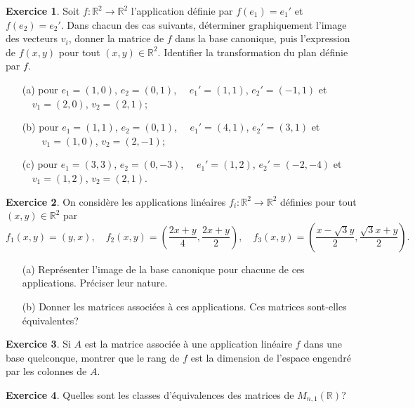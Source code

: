 \documentclass[11pt,a4paper]{article}
\theoremstyle{definition}
\newtheorem{exo}{Exercice}
\newcommand{\R}{\mathbb{R}}
\begin{document}
\begin{exo}
Soit $f: \R^2 \rightarrow \R^2$ l'application définie par $f(e_1)=e_1'$ et $f(e_2)=e_2'$. Dans chacun des cas suivants, déterminer graphiquement l'image des vecteurs $v_i$, donner la matrice de $f$ dans la base canonique, puis l'expression de $f(x,y)$ pour tout $(x,y)\in \R^2$.  Identifier la transformation du plan définie par $f$.
\begin{itemize}
\item[(a)] pour $e_1 = (1,0)$, $e_2=(0,1)$,  $\quad e_1' = (1,1)$, $e_2'=(-1,1)$ et $\quad v_1=(2,0)$, $v_2=(2,1)$;
\item[(b)] pour $e_1 = (1,1)$, $e_2=(0,1)$,  $\quad e_1' = (4,1)$, $e_2'=(3,1)$ et $\qquad v_1=(1,0)$, $v_2=(2,-1)$;
\item[(c)] pour $e_1 = (3,3)$, $ e_2=(0,-3)$, $\quad e_1' = (1,2)$, $e_2'=(-2,-4)$ et $\quad v_1=(1,2)$, $v_2=(2,1)$.

\end{itemize}
\end{exo}


\begin{exo}
On considère les applications linéaires $f_i : \R^2 \rightarrow \R^2$ définies pour tout $(x,y)\in \R^2$ par
$$f_1(x,y) = (y,x), \quad f_2(x,y) = \left({\frac{2x+y}{4},\frac{2x+y}{2}}\right), \quad f_3(x,y) = \left({\frac{x-\sqrt{3}y}{2},\frac{\sqrt{3}x+y}{2}}\right).$$
\begin{itemize}
\item[(a)] Représenter l'image de la base canonique pour chacune de ces applications. Préciser leur nature.
\item[(b)] Donner les matrices associées à ces applications. Ces matrices sont-elles équivalentes?
\end{itemize}
\end{exo}



\begin{exo}
Si $A$ est la matrice associée à une application linéaire $f$ dans une base quelconque, montrer que le rang de $f$ est la dimension de l'espace engendré par les colonnes de $A$.
\end{exo}



\begin{exo}
Quelles sont les classes d'équivalences des matrices de $M_{n,1}(\R)$?
\end{exo}
\end{document}
